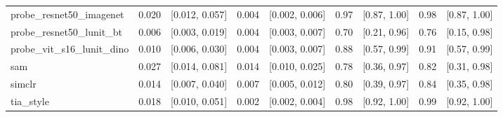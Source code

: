 \begin{tabular}{lrrrrrrrr}
probe\_resnet50\_imagenet & 0.020 & [0.012, 0.057] & 0.004 & [0.002, 0.006] & 0.97 & [0.87, 1.00] & 0.98 & [0.87, 1.00] \\
probe\_resnet50\_lunit\_bt & 0.006 & [0.003, 0.019] & 0.004 & [0.003, 0.007] & 0.70 & [0.21, 0.96] & 0.76 & [0.15, 0.98] \\
probe\_vit\_s16\_lunit\_dino & 0.010 & [0.006, 0.030] & 0.004 & [0.003, 0.007] & 0.88 & [0.57, 0.99] & 0.91 & [0.57, 0.99] \\
sam & 0.027 & [0.014, 0.081] & 0.014 & [0.010, 0.025] & 0.78 & [0.36, 0.97] & 0.82 & [0.31, 0.98] \\
simclr & 0.014 & [0.007, 0.040] & 0.007 & [0.005, 0.012] & 0.80 & [0.39, 0.97] & 0.84 & [0.35, 0.98] \\
tia\_style & 0.018 & [0.010, 0.051] & 0.002 & [0.002, 0.004] & 0.98 & [0.92, 1.00] & 0.99 & [0.92, 1.00] \\
\bottomrule
\end{tabular}
